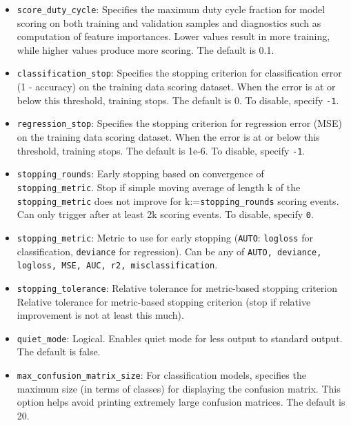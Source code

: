 {{{\begin{itemize}
\item \texttt{score\_duty\_cycle}: Specifies the maximum duty cycle fraction for model scoring on both training and validation samples and diagnostics such as computation of feature importances. Lower values result in more training, while higher values produce more scoring. The default is 0.1.

\item \texttt{classification\_stop}: Specifies the stopping criterion for classification error (1 - accuracy) on the training data scoring dataset.  When the error is at or below this threshold, training stops.  The default is 0.  To disable, specify \texttt{-1}. 

\item \texttt{regression\_stop}: Specifies the stopping criterion for regression error (MSE) on the training data scoring dataset. When the error is at or below this threshold, training stops. The default is 1e-6.  To disable, specify \texttt{-1}.

\item \texttt{stopping\_rounds}: Early stopping based on convergence of \\\texttt{stopping\_metric}. Stop if simple moving average of length k of the \texttt{stopping\_metric} does not improve for k:=\texttt{stopping\_rounds} scoring events. Can only trigger after at least 2k scoring events. To disable, specify \texttt{0}.

\item \texttt{stopping\_metric}: Metric to use for early stopping (\texttt{AUTO}: \texttt{logloss} for classification, \texttt{deviance} for regression). Can be any of \texttt{AUTO, deviance, logloss, MSE, AUC, r2, misclassification}.

\item \texttt{stopping\_tolerance}: Relative tolerance for metric-based stopping criterion Relative tolerance for metric-based stopping criterion (stop if relative improvement is not at least this much).

\item \texttt{quiet\_mode}: Logical. Enables quiet mode for less output to standard output. The default is false.

\item \texttt{max\_confusion\_matrix\_size}: For classification models, specifies the maximum size (in terms of classes) for displaying the confusion matrix. This option helps avoid printing extremely large confusion matrices. The default is 20.


\end{itemize}}}}
